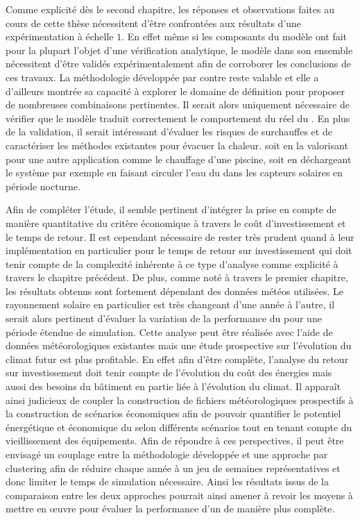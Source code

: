 Comme explicité dès le second chapitre, les réponses et observations faites au cours de
cette thèse nécessitent d’être confrontées aux résultats d’une expérimentation à échelle
$1$. En effet même si les composants du modèle ont fait pour la plupart l’objet d’une
vérification analytique, le modèle dans son ensemble nécessitent d’être validés
expérimentalement afin de corroborer les conclusions de ces travaux. La méthodologie
développée par contre reste valable et elle a d’ailleurs montrée sa capacité à explorer le
domaine de définition pour proposer de nombreuses combinaisons pertinentes. Il serait
alors uniquement nécessaire de vérifier que le modèle traduit correctement le comportement
du réel du . En plus de la validation, il serait intéressant d’évaluer les
risques de surchauffes et de caractériser les méthodes existantes pour évacuer la chaleur.
soit en la valorisant pour une autre application comme le chauffage d’une piscine, soit
en déchargeant le système par exemple en faisant circuler l’eau du  dans les
capteurs solaires en période nocturne.

Afin de compléter l’étude, il semble pertinent d’intégrer la prise en compte de manière
quantitative du critère économique à travers le coût d’investissement et le temps de
retour. Il est cependant nécessaire de rester très prudent quand à leur implémentation en
particulier pour le temps de retour sur investissement qui doit tenir compte de la
complexité inhérente à ce type d’analyse comme explicité à travers le chapitre précédent.
De plus, comme noté à travers le premier chapitre, les résultats obtenus sont fortement
dépendant des données météos utilisées. Le rayonnement solaire en particulier est très
changeant d’une année à l’autre, il serait alors pertinent d’évaluer la variation de la
performance du  pour une période étendue de simulation. Cette analyse peut être
réalisée avec l’aide de données météorologiques existantes mais une étude prospective sur
l’évolution du climat futur est plus profitable. En effet afin d’être complète, l’analyse
du retour sur investissement doit tenir compte de l’évolution du coût des énergies mais
aussi des besoins du bâtiment en partie liée à l’évolution du climat. Il apparaît ainsi
judicieux de coupler la construction de fichiers météorologiques prospectifs à la
construction de scénarios économiques afin de pouvoir quantifier le potentiel énergétique
et économique du  selon différents scénarios tout en tenant compte du
vieillissement des équipements. Afin de répondre à ces perspectives, il peut être envisagé
un couplage entre la méthodologie développée et une approche par clustering afin de
réduire chaque année à un jeu de semaines représentatives et donc limiter le temps de
simulation nécessaire. Ainsi les résultats issus de la comparaison entre les deux
approches pourrait ainsi amener à revoir les moyens à mettre en œuvre pour évaluer la
performance d’un  de manière plus complète.

